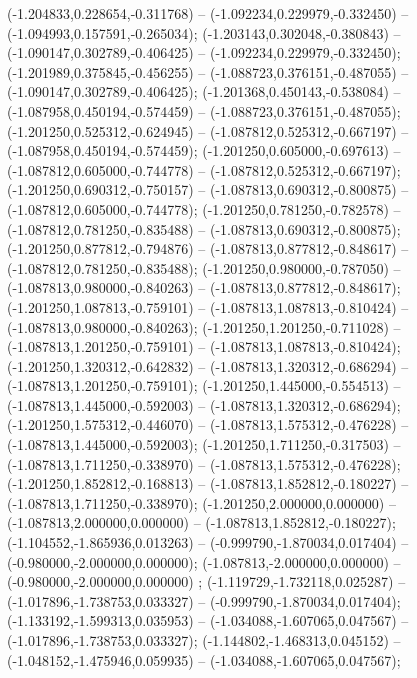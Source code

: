  (-1.204833,0.228654,-0.311768) -- (-1.092234,0.229979,-0.332450) -- (-1.094993,0.157591,-0.265034);
 (-1.203143,0.302048,-0.380843) -- (-1.090147,0.302789,-0.406425) -- (-1.092234,0.229979,-0.332450);
 (-1.201989,0.375845,-0.456255) -- (-1.088723,0.376151,-0.487055) -- (-1.090147,0.302789,-0.406425);
 (-1.201368,0.450143,-0.538084) -- (-1.087958,0.450194,-0.574459) -- (-1.088723,0.376151,-0.487055);
 (-1.201250,0.525312,-0.624945) -- (-1.087812,0.525312,-0.667197) -- (-1.087958,0.450194,-0.574459);
 (-1.201250,0.605000,-0.697613) -- (-1.087812,0.605000,-0.744778) -- (-1.087812,0.525312,-0.667197);
 (-1.201250,0.690312,-0.750157) -- (-1.087813,0.690312,-0.800875) -- (-1.087812,0.605000,-0.744778);
 (-1.201250,0.781250,-0.782578) -- (-1.087812,0.781250,-0.835488) -- (-1.087813,0.690312,-0.800875);
 (-1.201250,0.877812,-0.794876) -- (-1.087813,0.877812,-0.848617) -- (-1.087812,0.781250,-0.835488);
 (-1.201250,0.980000,-0.787050) -- (-1.087813,0.980000,-0.840263) -- (-1.087813,0.877812,-0.848617);
 (-1.201250,1.087813,-0.759101) -- (-1.087813,1.087813,-0.810424) -- (-1.087813,0.980000,-0.840263);
 (-1.201250,1.201250,-0.711028) -- (-1.087813,1.201250,-0.759101) -- (-1.087813,1.087813,-0.810424);
 (-1.201250,1.320312,-0.642832) -- (-1.087813,1.320312,-0.686294) -- (-1.087813,1.201250,-0.759101);
 (-1.201250,1.445000,-0.554513) -- (-1.087813,1.445000,-0.592003) -- (-1.087813,1.320312,-0.686294);
 (-1.201250,1.575312,-0.446070) -- (-1.087813,1.575312,-0.476228) -- (-1.087813,1.445000,-0.592003);
 (-1.201250,1.711250,-0.317503) -- (-1.087813,1.711250,-0.338970) -- (-1.087813,1.575312,-0.476228);
 (-1.201250,1.852812,-0.168813) -- (-1.087813,1.852812,-0.180227) -- (-1.087813,1.711250,-0.338970);
 (-1.201250,2.000000,0.000000) -- (-1.087813,2.000000,0.000000) -- (-1.087813,1.852812,-0.180227);
 (-1.104552,-1.865936,0.013263) -- (-0.999790,-1.870034,0.017404) -- (-0.980000,-2.000000,0.000000);
 (-1.087813,-2.000000,0.000000) -- (-0.980000,-2.000000,0.000000) ;
 (-1.119729,-1.732118,0.025287) -- (-1.017896,-1.738753,0.033327) -- (-0.999790,-1.870034,0.017404);
 (-1.133192,-1.599313,0.035953) -- (-1.034088,-1.607065,0.047567) -- (-1.017896,-1.738753,0.033327);
 (-1.144802,-1.468313,0.045152) -- (-1.048152,-1.475946,0.059935) -- (-1.034088,-1.607065,0.047567);
